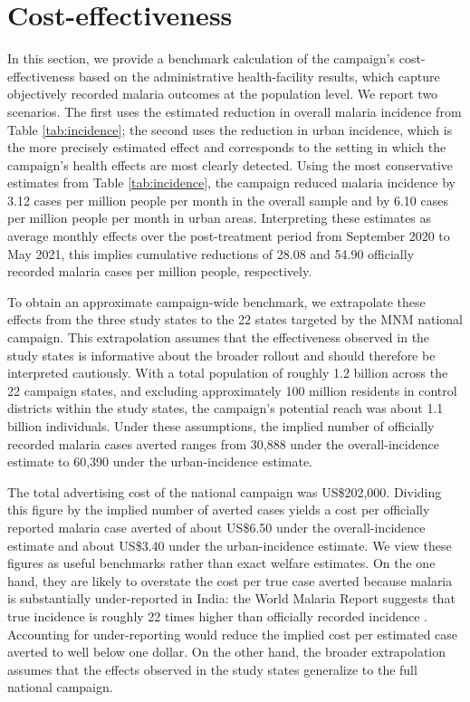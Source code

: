 \section{Cost-effectiveness}

In this section, we provide a benchmark calculation of the campaign’s cost-effectiveness based on the administrative health-facility results, which capture objectively recorded malaria outcomes at the population level. We report two scenarios. The first uses the estimated reduction in overall malaria incidence from Table \ref{tab:incidence}; the second uses the reduction in urban incidence, which is the more precisely estimated effect and corresponds to the setting in which the campaign’s health effects are most clearly detected. Using the most conservative estimates from Table \ref{tab:incidence}, the campaign reduced malaria incidence by 3.12 cases per million people per month in the overall sample and by 6.10 cases per million people per month in urban areas. Interpreting these estimates as average monthly effects over the post-treatment period from September 2020 to May 2021, this implies cumulative reductions of 28.08 and 54.90 officially recorded malaria cases per million people, respectively.

To obtain an approximate campaign-wide benchmark, we extrapolate these effects from the three study states to the 22 states targeted by the MNM national campaign. This extrapolation assumes that the effectiveness observed in the study states is informative about the broader rollout and should therefore be interpreted cautiously. With a total population of roughly 1.2 billion across the 22 campaign states, and excluding approximately 100 million residents in control districts within the study states, the campaign’s potential reach was about 1.1 billion individuals. Under these assumptions, the implied number of officially recorded malaria cases averted ranges from 30,888 under the overall-incidence estimate to 60,390 under the urban-incidence estimate.

The total advertising cost of the national campaign was US\$202{,}000. Dividing this figure by the implied number of averted cases yields a cost per officially reported malaria case averted of about US\$6.50 under the overall-incidence estimate and about US\$3.40 under the urban-incidence estimate. We view these figures as useful benchmarks rather than exact welfare estimates. On the one hand, they are likely to overstate the cost per true case averted because malaria is substantially under-reported in India: the World Malaria Report suggests that true incidence is roughly 22 times higher than officially recorded incidence \citep{world2021malaria}. Accounting for under-reporting would reduce the implied cost per estimated case averted to well below one dollar. On the other hand, the broader extrapolation assumes that the effects observed in the study states generalize to the full national campaign.

